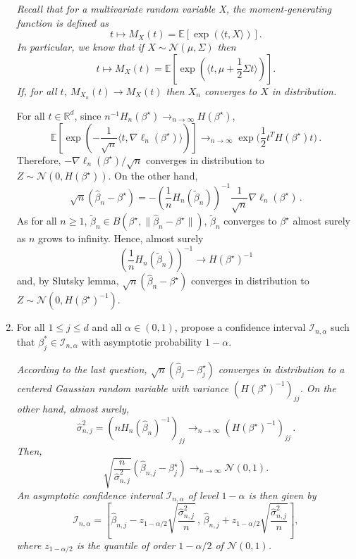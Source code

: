 \documentclass[a4paper,10pt,fleqn]{article}
\newcommand{\eqsp}{\,}
\newcommand{\rset}{\ensuremath{\mathbb{R}}}
\newcommand{\1}{\ensuremath{\mathbbm{1}}}
\newcommand{\bE}{\mathbb{E}}
\begin{document}
\begin{enumerate}
\vspace{.2cm}

{\em
 Recall that for a multivariate random variable X, the moment-generating function is defined as 
$$
t\mapsto M_X(t) = \bE \left[ \exp\left( \langle t, X \rangle \right) \right].
$$
In particular, we know that if $X \sim \mathcal{N}(\mu, \Sigma)$ then 
$$
t\mapsto M_X(t) = \bE \left[ \exp \left( \langle t, \mu + \frac{1}{2} \Sigma t \rangle \right) \right].
$$
If, for all $t$, $M_{X_n}(t) \to M_X(t)$ then $X_n$ converges to $X$ in distribution. 

For all $t\in\rset^d$, since $n^{-1} H_n(\beta^{\star}) \to_{n\to \infty} H(\beta^{\star})$,
\[
\bE \left[ \exp\left( - \frac{1}{\sqrt{n}} \langle t, \nabla \ell_n(\beta^{\star}) \rangle \right) \right] \to_{n\to \infty}  \exp\Bigg( \frac{1}{2} t^T H(\beta^{\star}) t \Bigg)\eqsp.
\]
Therefore, $-\nabla \ell_n(\beta^{\star}) / \sqrt{n}$ converges in distribution to  $Z \sim \mathcal{N}(0, H(\beta^{\star}))$. On the other hand, 
$$
\sqrt{n} (\widehat{\beta}_n - \beta^{\star}) = - \left( \frac{1}{n} H_n(\tilde{\beta}_n) \right)^{-1} \frac{1}{\sqrt{n}} \nabla \ell_n(\beta^{\star})\eqsp.
$$
As for all $n\geqslant 1$, $\tilde{\beta}_n \in B(\beta^{\star}, \|\widehat{\beta}_n - \beta^{\star}\|)$, $\tilde{\beta}_n$ converges to  $\beta^{\star}$ almost surely as $n$ grows to infinity. Hence, almost surely
$$
\left( \frac{1}{n} H_n(\tilde{\beta}_n) \right)^{-1} \to H(\beta^{\star})^{-1}
$$
and, by Slutsky lemma, $\sqrt{n} (\widehat{\beta}_n - \beta^{\star})$  converges in distribution to  $Z \sim \mathcal{N}(0,  H(\beta^{\star})^{-1})$.
}

\item For all $1\leqslant j \leqslant d$ and all $\alpha\in(0,1)$, propose a confidence interval $\mathcal{I}_{n,\alpha}$ such that $\beta^*_{j}\in \mathcal{I}_{n,\alpha}$ with asymptotic probability $1-\alpha$.

\vspace{.2cm}

{\em
According to the last question, $\sqrt{n} ( \widehat{\beta}_j - \beta^{\star}_j) $ converges in distribution to a centered Gaussian random variable with variance $(H(\beta^{\star})^{-1})_{jj}$. On the other hand, almost surely,
$$
\widehat{\sigma}_{n,j}^2 = (n H_n(\widehat{\beta}_n)^{-1})_{jj} \to_{n\to \infty} (H(\beta^{\star})^{-1})_{jj}\eqsp.
$$
Then, 
$$
\sqrt{\frac{n}{\widehat{\sigma}_{n,j}^2}} (\widehat{\beta}_{n,j} - \beta^{\star}_j ) \to_{n\to \infty} \mathcal{N}(0,1).
$$
An asymptotic confidence interval $\mathcal{I}_{n,\alpha}$ of level $1-\alpha$ is then given by
$$
\mathcal{I}_{n,\alpha} = \left[ \widehat{\beta}_{n,j} - z_{1-\alpha/2} \sqrt{\frac{\widehat{\sigma}^2_{n,j}}{n}}\eqsp,\eqsp \widehat{\beta}_{n,j} + z_{1-\alpha/2} \sqrt{\frac{\widehat{\sigma}^2_{n,j}}{n}}  \right],
$$
where $z_{1- \alpha/2}$ is the quantile of order $1- \alpha/2$ of $\mathcal{N}(0, 1)$.
}
\end{enumerate}
\end{document}
